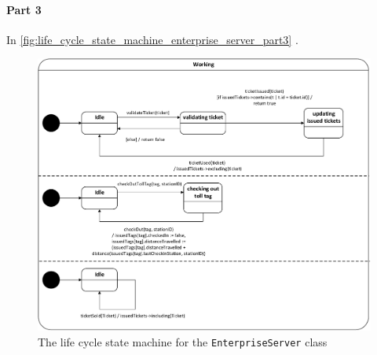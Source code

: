 \paragraph*{Part 3} In \autoref{fig:life_cycle_state_machine_enterprise_server_part3} .

\begin{figure}[H]
\centering
\includegraphics[width=0.7\linewidth]{img/behaviour_state_machines/life_cycle_state_machines/life_cycle_state_machine_enterprise_server_part3}
\caption{The life cycle state machine for the \texttt{EnterpriseServer} class}
\label{fig:life_cycle_state_machine_enterprise_server_part3}
\end{figure}